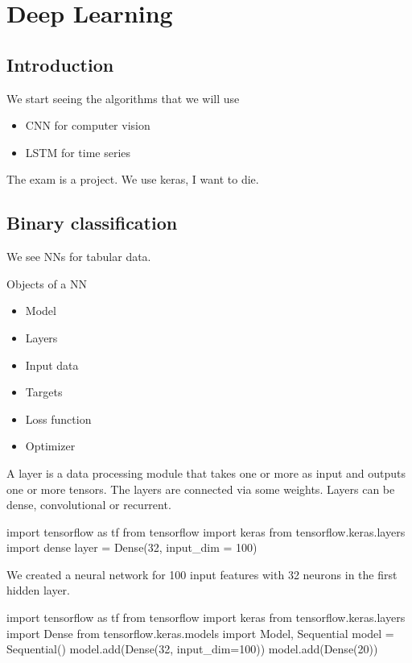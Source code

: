 \section{Deep Learning}

\subsection{Introduction}

We start seeing the algorithms that we will use

\begin{itemize}
    \item CNN for computer vision
    \item LSTM for time series
\end{itemize}

The exam is a project. We use keras, I want to die. 


\subsection{Binary classification}


We see NNs for tabular data.

\vspace{10pt}

Objects of a NN

\begin{itemize}
    \item Model
    \item Layers
    \item Input data
    \item Targets
    \item Loss function
    \item Optimizer
\end{itemize}

A layer is a data processing module that takes one or more as input and outputs one or more tensors. The layers are connected via some weights. Layers can be dense, convolutional or recurrent.


\begin{pythoncode}
    import tensorflow as tf
    from tensorflow import keras
    from tensorflow.keras.layers import dense
    layer = Dense(32, input_dim = 100)
\end{pythoncode}

We created a neural network for 100 input features with 32 neurons in the first hidden layer. 

\begin{pythoncode}
    import tensorflow as tf
    from tensorflow import keras
    from tensorflow.keras.layers import Dense
    from tensorflow.keras.models import Model, Sequential
    model = Sequential()
    model.add(Dense(32, input_dim=100))
    model.add(Dense(20))
\end{pythoncode}

